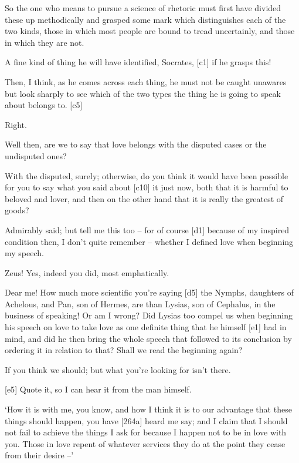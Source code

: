  So the one who means to pursue a science of rhetoric must first
have divided these up methodically and grasped some mark which
distinguishes each of the two kinds, those in which most
people are bound to
tread uncertainly, and those in which they are not.

 A fine kind of thing he will have identified, Socrates,
{[}c1{]} if he grasps this!

 Then, I think, as he comes across each thing, he must not be
caught unawares but look sharply to see which of the two types the thing
he is going to speak about belongs to. {[}c5{]}

 Right.

 Well then, are we to say that love belongs with the disputed
cases or the undisputed ones?

 With the disputed, surely; otherwise, do you think it would
have been possible for you to say what you said about {[}c10{]} it just
now, both that it is harmful to beloved and lover, and then on the other
hand that it is really the greatest of goods?

 Admirably said; but tell me this too -- for of course {[}d1{]}
because of my inspired condition then, I don't quite remember -- whether
I defined love when beginning my speech.

 Zeus! Yes, indeed you did, most emphatically.

 Dear me! How much more scientific you're saying {[}d5{]} the
Nymphs, daughters of Achelous, and Pan, son of Hermes, are than Lysias,
son of Cephalus, in the business of speaking! Or am I wrong? Did Lysias
too compel us when beginning his speech on love to take love as one
definite thing that he himself {[}e1{]} had in mind, and did he then
bring the whole speech that followed to its conclusion by ordering it in
relation to that? Shall we read the beginning again?

 If you think we should; but what you're looking for isn't
there.

{[}e5{]}  Quote it, so I can hear it from the man himself.

 ‘How it is with me, you know, and how I think it is to our
advantage that these things should happen, you have {[}264a{]} heard me
say; and I claim that I should not fail to achieve the things I ask for
because I happen not to be in love with you. Those in love repent of
whatever services they do at the point they cease from their desire --'

